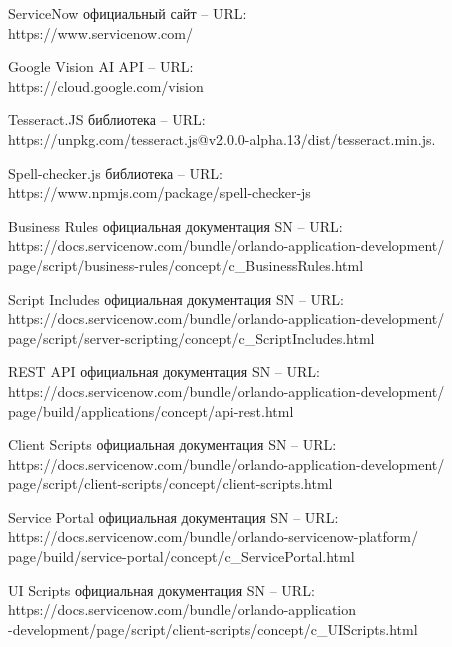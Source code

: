 \documentclass[14pt]{mmcs_article}
\begin{document}
\begin{thebibliography}{0}
ServiceNow официальный сайт – URL: \\https://www.servicenow.com/

Google Vision AI API – URL: \\https://cloud.google.com/vision

Tesseract.JS библиотека – URL: \\https://unpkg.com/tesseract.js@v2.0.0-alpha.13/dist/tesseract.min.js.

Spell-checker.js библиотека – URL: \\https://www.npmjs.com/package/spell-checker-js

Business Rules официальная документация SN  – URL: \\https://docs.servicenow.com/bundle/orlando-application-development/\\page/script/business-rules/concept/c\_BusinessRules.html


Script Includes официальная документация SN  – URL: \\https://docs.servicenow.com/bundle/orlando-application-development/\\page/script/server-scripting/concept/c\_ScriptIncludes.html

REST API официальная документация SN  – URL: \\https://docs.servicenow.com/bundle/orlando-application-development/\\page/build/applications/concept/api-rest.html

Client Scripts официальная документация SN  – URL: \\https://docs.servicenow.com/bundle/orlando-application-development/\\page/script/client-scripts/concept/client-scripts.html

Service Portal официальная документация SN  – URL: \\https://docs.servicenow.com/bundle/orlando-servicenow-platform/\\page/build/service-portal/concept/c\_ServicePortal.html

UI Scripts официальная документация SN  – URL: \\https://docs.servicenow.com/bundle/orlando-application\\-development/page/script/client-scripts/\-concept/c\_UIScripts.html


\end{thebibliography}
\end{document}
